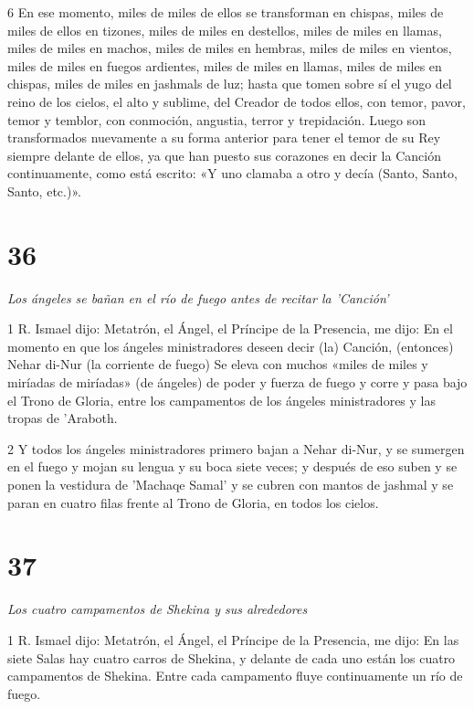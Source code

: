 \par 6 En ese momento, miles de miles de ellos se transforman en chispas, miles de miles de ellos en tizones, miles de miles en destellos, miles de miles en llamas, miles de miles en machos, miles de miles en hembras, miles de miles en vientos, miles de miles en fuegos ardientes, miles de miles en llamas, miles de miles en chispas, miles de miles en jashmals de luz; hasta que tomen sobre sí el yugo del reino de los cielos, el alto y sublime, del Creador de todos ellos, con temor, pavor, temor y temblor, con conmoción, angustia, terror y trepidación. Luego son transformados nuevamente a su forma anterior para tener el temor de su Rey siempre delante de ellos, ya que han puesto sus corazones en decir la Canción continuamente, como está escrito: «Y uno clamaba a otro y decía (Santo, Santo, Santo, etc.)».


\chapter{36}

\par \textit{Los ángeles se bañan en el río de fuego antes de recitar la 'Canción'}

\par 1 R. Ismael dijo: Metatrón, el Ángel, el Príncipe de la Presencia, me dijo: En el momento en que los ángeles ministradores deseen decir (la) Canción, (entonces) Nehar di-Nur (la corriente de fuego) Se eleva con muchos «miles de miles y miríadas de miríadas» (de ángeles) de poder y fuerza de fuego y corre y pasa bajo el Trono de Gloria, entre los campamentos de los ángeles ministradores y las tropas de 'Araboth.

\par 2 Y todos los ángeles ministradores primero bajan a Nehar di-Nur, y se sumergen en el fuego y mojan su lengua y su boca siete veces; y después de eso suben y se ponen la vestidura de 'Machaqe Samal' y se cubren con mantos de jashmal y se paran en cuatro filas frente al Trono de Gloria, en todos los cielos.


\chapter{37}

\par \textit{Los cuatro campamentos de Shekina y sus alrededores}

\par 1 R. Ismael dijo: Metatrón, el Ángel, el Príncipe de la Presencia, me dijo: En las siete Salas hay cuatro carros de Shekina, y delante de cada uno están los cuatro campamentos de Shekina. Entre cada campamento fluye continuamente un río de fuego.


